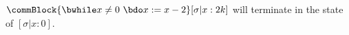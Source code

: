 $\commBlock{\bwhile x\ne 0\ \bdo x:=x-2 }[\sigma|x:2k]$ will terminate in the state of $[\sigma|x:0]$.